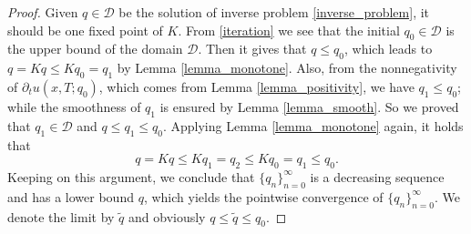 \documentclass[11pt]{article}
\numberwithin{equation}{section}
\begin{document}
\begin{proof}
 Given $q\in \mathcal D$ be the solution of inverse problem \eqref{inverse_problem}, it should be one fixed point of $K$. From \eqref{iteration} we see that the initial $q_0\in\mathcal D$ is the upper bound of the domain $\mathcal D$. Then it gives that $q\le q_0$, which leads to $q=Kq\le Kq_0=q_1$ by Lemma \ref{lemma_monotone}. Also, from the nonnegativity of $\partial_t u(x,T;q_0)$, which comes from Lemma \ref{lemma_positivity}, we have $q_1\le q_0$; while the smoothness of $q_1$ is ensured by Lemma \ref{lemma_smooth}. So we proved that $q_1\in\mathcal D$ and $q\le q_1\le q_0$. Applying Lemma \ref{lemma_monotone} again, it holds that 
 \begin{equation*}
  q=Kq\le Kq_1=q_2\le Kq_0=q_1\le q_0.
 \end{equation*}
Keeping on this argument, we conclude that $\{q_n\}_{n=0}^\infty$ is a decreasing sequence and has a lower bound $q$, which yields the pointwise convergence of $\{q_n\}_{n=0}^\infty$. We denote the limit by $\tilde q$ and obviously $q\le \tilde q\le q_0$. 


\end{proof}
\end{document}
